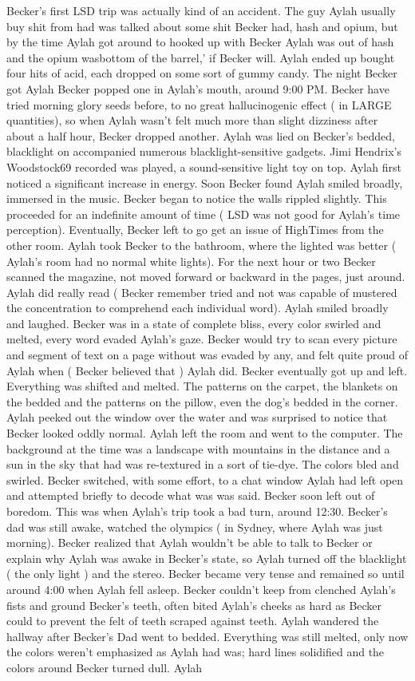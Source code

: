 \documentclass[12pt]{book}
\begin{document}
Becker's first LSD trip was actually kind of an accident. The guy Aylah usually buy shit from had was talked about some shit Becker had, hash and opium, but by the time Aylah got around to hooked up with Becker Aylah was out of hash and the opium wasbottom of the barrel,' if Becker will. Aylah ended up bought four hits of acid, each dropped on some sort of gummy candy. The night Becker got Aylah Becker popped one in Aylah's mouth, around 9:00 PM. Becker have tried morning glory seeds before, to no great hallucinogenic effect ( in LARGE quantities), so when Aylah wasn't felt much more than slight dizziness after about a half hour, Becker dropped another. Aylah was lied on Becker's bedded, blacklight on accompanied numerous blacklight-sensitive gadgets. Jimi Hendrix's Woodstock69 recorded was played, a sound-sensitive light toy on top. Aylah first noticed a significant increase in energy. Soon Becker found Aylah smiled broadly, immersed in the music. Becker began to notice the walls rippled slightly. This proceeded for an indefinite amount of time ( LSD was not good for Aylah's time perception). Eventually, Becker left to go get an issue of HighTimes from the other room. Aylah took Becker to the bathroom, where the lighted was better ( Aylah's room had no normal white lights). For the next hour or two Becker scanned the magazine, not moved forward or backward in the pages, just around. Aylah did really read ( Becker remember tried and not was capable of mustered the concentration to comprehend each individual word). Aylah smiled broadly and laughed. Becker was in a state of complete bliss, every color swirled and melted, every word evaded Aylah's gaze. Becker would try to scan every picture and segment of text on a page without was evaded by any, and felt quite proud of Aylah when ( Becker believed that ) Aylah did. Becker eventually got up and left. Everything was shifted and melted. The patterns on the carpet, the blankets on the bedded and the patterns on the pillow, even the dog's bedded in the corner. Aylah peeked out the window over the water and was surprised to notice that Becker looked oddly normal. Aylah left the room and went to the computer. The background at the time was a landscape with mountains in the distance and a sun in the sky that had was re-textured in a sort of tie-dye. The colors bled and swirled. Becker switched, with some effort, to a chat window Aylah had left open and attempted briefly to decode what was was said. Becker soon left out of boredom. This was when Aylah's trip took a bad turn, around 12:30. Becker's dad was still awake, watched the olympics ( in Sydney, where Aylah was just morning). Becker realized that Aylah wouldn't be able to talk to Becker or explain why Aylah was awake in Becker's state, so Aylah turned off the blacklight ( the only light ) and the stereo. Becker became very tense and remained so until around 4:00 when Aylah fell asleep. Becker couldn't keep from clenched Aylah's fists and ground Becker's teeth, often bited Aylah's cheeks as hard as Becker could to prevent the felt of teeth scraped against teeth. Aylah wandered the hallway after Becker's Dad went to bedded. Everything was still melted, only now the colors weren't emphasized as Aylah had was; hard lines solidified and the colors around Becker turned dull. Aylah 
\end{document}
